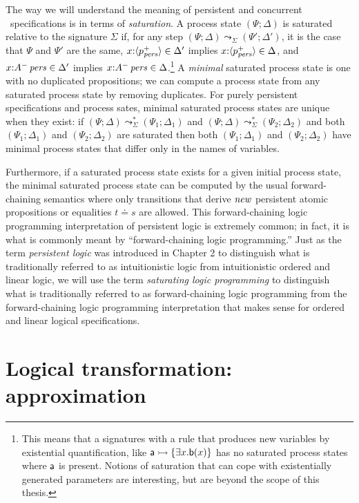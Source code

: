 The way we will understand the meaning of persistent and concurrent
\sls~specifications is in terms of {\it saturation}. A process state
$(\Psi; \Delta)$ is saturated relative to the signature $\Sigma$ if,
for any step $(\Psi; \Delta) \leadsto_\Sigma (\Psi'; \Delta')$, it is
the case that $\Psi$ and $\Psi'$ are the same, $x{:}\langle {p^+_{\it pers}} \rangle
\in \Delta'$ implies $x{:}\langle {p^+_{\it pers}} \rangle \in \Delta$, and
$x{:}{A^-}\,{{\it pers}} \in \Delta'$ implies $x{:}{A^-}\,{{\it pers}} \in
\Delta$.\footnote{This means that a signatures with a rule that
  produces new variables by existential quantification, like ${\sf a}
  \rightarrowtail \{ \exists x. {\sf b}(x) \}$ has no saturated process states
  where ${\sf a}$ is present. Notions of saturation that can cope with
  existentially generated parameters are interesting, but are beyond
  the scope of this thesis.} A {\it minimal} saturated process state
is one with no duplicated propositions; we can compute a process state
from any saturated process state by removing duplicates. For purely
persistent specifications and process sates, minimal saturated process
states are unique when they exist: if $(\Psi; \Delta)
\leadsto^*_\Sigma (\Psi_1; \Delta_1)$ and $(\Psi; \Delta)
\leadsto^*_\Sigma (\Psi_2; \Delta_2)$ and both $(\Psi_1; \Delta_1)$
and $(\Psi_2; \Delta_2)$ are saturated then both $(\Psi_1; \Delta_1)$
and $(\Psi_2; \Delta_2)$ have minimal process states that differ only
in the names of variables.

Furthermore, if a saturated process state exists for a given initial
process state, the minimal saturated process state can be computed by
the usual forward-chaining semantics where only transitions that
derive ${\it new}$ persistent atomic propositions or equalities $t
\doteq s$ are allowed. This forward-chaining logic programming
interpretation of persistent logic is extremely common; in fact, it is
what is commonly meant by ``forward-chaining logic programming.'' Just
as the term {\it persistent logic} was introduced in Chapter 2 to
distinguish what is traditionally referred to as intuitionistic logic
from intuitionistic ordered and linear logic, we will use the term
{\it saturating logic programming} to distinguish what is
traditionally referred to as forward-chaining logic programming from
the forward-chaining logic programming interpretation that makes sense
for ordered and linear logical specifications.

\section{Logical transformation: approximation}
\label{sec:abstraction}


